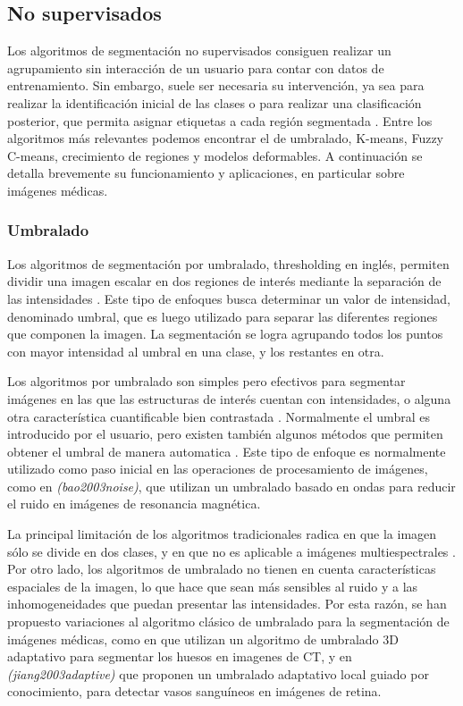 \subsection{No supervisados}
Los algoritmos de segmentación no supervisados consiguen realizar un agrupamiento sin interacción de un usuario para contar con datos de entrenamiento. Sin embargo, suele ser necesaria su intervención, ya sea para realizar la identificación inicial de las clases o para realizar una clasificación posterior, que permita asignar etiquetas a cada región segmentada \citep{clarke1995mri}.
Entre los algoritmos más relevantes podemos encontrar el de umbralado, K-means, Fuzzy C-means, crecimiento de regiones y modelos deformables. A continuación se detalla brevemente su funcionamiento y aplicaciones, en particular sobre imágenes médicas.

\subsubsection{Umbralado}
Los algoritmos de segmentación por umbralado,  thresholding en inglés, permiten dividir una imagen escalar en dos regiones de interés mediante la separación de las intensidades \citep{weszka1978survey}. Este tipo de enfoques busca determinar un valor de intensidad, denominado umbral, que es luego utilizado para separar las diferentes regiones que componen la imagen. La segmentación se logra agrupando todos los puntos con mayor intensidad al umbral en una clase, y los restantes en otra.

Los algoritmos por umbralado son simples pero efectivos para segmentar imágenes en las que las estructuras de interés cuentan con intensidades, o alguna otra característica cuantificable bien contrastada \citep{pham2000current}. Normalmente el umbral es introducido por el usuario, pero existen también algunos métodos que permiten obtener el umbral de manera automatica \citep{sahoo1988survey}. Este tipo de enfoque es normalmente utilizado como paso inicial en las operaciones de procesamiento de imágenes, como en \emph{(bao2003noise)}, que utilizan un umbralado basado en ondas para reducir el ruido en imágenes de resonancia magnética.

La  principal limitación de los algoritmos tradicionales radica en que la imagen sólo se divide en dos clases, y en que no es aplicable a imágenes multiespectrales \citep{pham2000current}. Por otro lado, los algoritmos de umbralado no tienen en cuenta características espaciales de la imagen, lo que hace que sean más sensibles al ruido y a las inhomogeneidades que puedan presentar las intensidades. Por esta razón, se han propuesto variaciones al algoritmo clásico de umbralado para la segmentación de imágenes médicas, como en \citep{zhang2010fast} que utilizan un algoritmo de umbralado 3D adaptativo para segmentar los huesos en imagenes de CT, y en \emph{(jiang2003adaptive)} que proponen un umbralado adaptativo local guiado por conocimiento, para detectar vasos sanguíneos en imágenes de retina.

